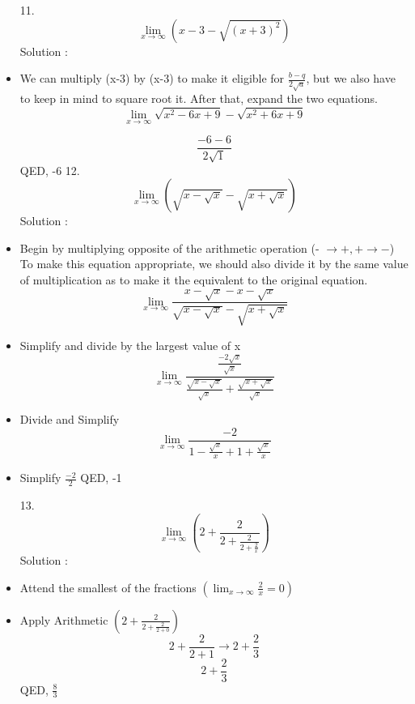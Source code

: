 \documentclass{article}
\begin{document}
\begin{itemize}
11. $$\displaystyle \lim_{x\to\infty}\left(x-3-\sqrt{(x+3)^2}\right)$$
Solution : 

\item We can multiply (x-3) by (x-3) to make it eligible for $\frac{b-q}{2\sqrt{a}}$, but we also have to keep in mind to square root it. After that, expand the two equations.
$$\displaystyle \lim_{x\to\infty} \sqrt{x^2-6x+9}-\sqrt{x^2+6x+9}$$

$$\frac{-6-6}{2\sqrt{1}}$$
QED, -6
12. $$\displaystyle \lim_{x\to\infty} (\sqrt{x-\sqrt{x}}-\sqrt{x+\sqrt{x}})$$
Solution : 

\item Begin by multiplying opposite of the arithmetic operation (- $\to +, + \to -$) To make this equation appropriate, we should also divide it by the same value of multiplication as to make it the equivalent to the original equation.
$$\displaystyle \lim_{x\to\infty} \frac{x-\sqrt{x}-x-\sqrt{x}}{\sqrt{x-\sqrt{x}}-\sqrt{x+\sqrt{x}}}$$
\item Simplify and divide by the largest value of x
$$\displaystyle \lim_{x\to\infty}\frac{\frac{-2\sqrt{x}}{\sqrt{x}}}{\frac{\sqrt{x-\sqrt{x}}}{\sqrt{x}}+\frac{\sqrt{x+\sqrt{x}}}{\sqrt{x}}}$$
\item Divide and Simplify 
$$\displaystyle \lim_{x\to\infty}\frac{-2}{1-\frac{\sqrt{x}}{x}+1+\frac{\sqrt{x}}x}$$
\item Simplify
$\frac{-2}{2}$
QED, -1

13. $$\displaystyle \lim_{x\to\infty}\left(2+\frac{2}{2+\frac{2}{2+\frac{2}{x}}}\right)$$
Solution : 

\item Attend the smallest of the fractions $\left(\displaystyle \lim_{x\to\infty}\frac{2}{x} = 0\right)$
\item Apply Arithmetic
$\left(2+\frac{2}{2+\frac{2}{2+0}}\right)$
$$2+\frac{2}{2+1}\to 2+\frac{2}{3}$$
$$2+\frac{2}{3}$$
QED, $\frac{8}{3}$


\end{itemize}
\end{document}
